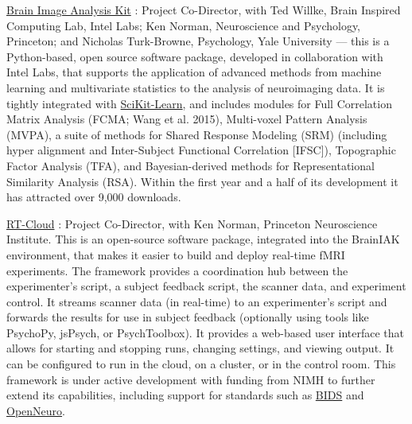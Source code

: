 \documentclass[10 pt]{article}
\begin{document}
\href{http://BrainIAK.org}{Brain Image Analysis Kit} \cite{kumar2021brainiak}: Project Co-Director, with Ted Willke, Brain Inspired Computing Lab, Intel Labs; Ken Norman, Neuroscience and Psychology, Princeton; and Nicholas Turk-Browne, Psychology, Yale University — this is a Python-based, open source software package, developed in collaboration with Intel Labs, that supports the application of advanced methods from machine learning and multivariate statistics to the analysis of neuroimaging data. It is tightly integrated with \href{http://scikit-learn.org/}{SciKit-Learn}, and includes modules for Full Correlation Matrix Analysis (FCMA; Wang et al. 2015), Multi-voxel Pattern Analysis (MVPA), a suite of methods for Shared Response Modeling (SRM) (including hyper alignment and Inter-Subject Functional Correlation [IFSC]), Topographic Factor Analysis (TFA), and Bayesian-derived methods for Representational Similarity Analysis (RSA). Within the first year and a half of its development it has attracted over 9,000 downloads.
    \smallskip

\href{https://github.com/brainiak/rt-cloud}{RT-Cloud} \cite{wallace2022rtcloud}: Project Co-Director, with Ken Norman, Princeton Neuroscience Institute. This is an open-source software package, integrated into the BrainIAK environment, that makes it easier to build and deploy real-time fMRI experiments. The framework provides a coordination hub between the experimenter’s script, a subject feedback script, the scanner data, and experiment control. It streams scanner data (in real-time) to an experimenter’s script and forwards the results for use in subject feedback (optionally using tools like PsychoPy, jsPsych, or PsychToolbox). It provides a web-based user interface that allows for starting and stopping runs, changing settings, and viewing output. It can be configured to run in the cloud, on a cluster, or in the control room. This framework is under active development with funding from NIMH to further extend its capabilities, including support for standards such as \href{https://bids.neuroimaging.io}{BIDS} and \href{https://openneuro.org}{OpenNeuro}.
    \smallskip
\end{document}
